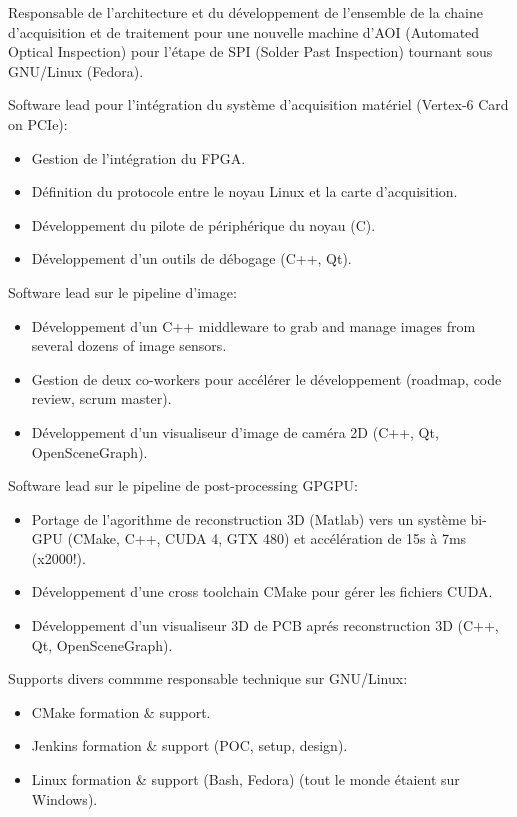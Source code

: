 \documentclass{article}
\begin{document}
\begin{llist}
{Responsable de l'architecture et du d\'{e}veloppement de l'ensemble de la chaine d'acquisition et de traitement
pour une nouvelle machine d'AOI (Automated Optical Inspection) pour l'\'{e}tape de SPI (Solder Past Inspection)
tournant sous GNU/Linux (Fedora).

Software lead pour l'int\'{e}gration du syst\`{e}me d'acquisition mat\'{e}riel (Vertex-6 Card on PCIe):
\vspace{-0.33cm}
\begin{itemize}
	\item Gestion de l'int\'{e}gration du FPGA.
	\item D\'{e}finition du protocole entre le noyau Linux et la carte d'acquisition.
	\item D\'{e}veloppement du pilote de p\'{e}riph\'{e}rique du noyau (C).
	\item D\'{e}veloppement d'un outils de d\'{e}bogage (C++, Qt).
\end{itemize}
Software lead sur le pipeline d'image:
\vspace{-0.33cm}
\begin{itemize}
	\item D\'{e}veloppement d'un C++ middleware to grab and manage images from several dozens of image sensors.
	\item Gestion de deux co-workers pour acc\'{e}l\'{e}rer le d\'{e}veloppement (roadmap, code review, scrum master).
	\item D\'{e}veloppement d'un visualiseur d'image de cam\'{e}ra 2D (C++, Qt, OpenSceneGraph).
\end{itemize}
Software lead sur le pipeline de post-processing GPGPU:
\vspace{-0.33cm}
\begin{itemize}
	\item Portage de l'agorithme de reconstruction 3D (Matlab) vers un syst\`{e}me bi-GPU (CMake, C++, CUDA 4, GTX 480)
		et acc\'{e}l\'{e}ration de 15s \`{a} 7ms (x2000!).
	\item D\'{e}veloppement d'une cross toolchain CMake pour g\'{e}rer les fichiers CUDA.
	\item D\'{e}veloppement d'un visualiseur 3D de PCB apr\'{e}s reconstruction 3D (C++, Qt, OpenSceneGraph).
\end{itemize}

Supports divers commme responsable technique sur GNU/Linux:
\vspace{-0.33cm}
\begin{itemize}
	\item CMake formation \& support.
	\item Jenkins formation \& support (POC, setup, design).
	\item Linux formation \& support (Bash, Fedora) (tout le monde \'{e}taient sur Windows).
\end{itemize}
}


\end{llist}
\end{document}
